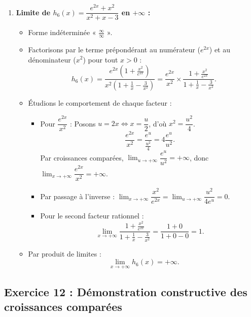 \documentclass[11pt,a4paper]{article}
\begin{document}
\begin{correctionbox}[Exercice 11]
\begin{enumerate}[label=\textbf{\arabic*.}]
    \item \textbf{Limite de $h_6(x) = \dfrac{e^{2x} + x^2}{x^2 + x - 3}$ en $+\infty$ :}
    \begin{itemize}
        \item Forme indéterminée « $\frac{\infty}{\infty}$ ».
        \item Factorisons par le terme prépondérant au numérateur ($e^{2x}$) et au dénominateur ($x^2$) pour tout $x > 0$ :
        \[
        h_6(x) = \frac{e^{2x}\left(1 + \frac{x^2}{e^{2x}}\right)}{x^2\left(1 + \frac{1}{x} - \frac{3}{x^2}\right)} = \frac{e^{2x}}{x^2} \times \frac{1 + \frac{x^2}{e^{2x}}}{1 + \frac{1}{x} - \frac{3}{x^2}}.
        \]
        \item Étudions le comportement de chaque facteur :
        \begin{itemize}
            \item Pour $\dfrac{e^{2x}}{x^2}$ : Posons $u = 2x \iff x = \dfrac{u}{2}$, d'où $x^2 = \dfrac{u^2}{4}$.
            \[
            \frac{e^{2x}}{x^2} = \frac{e^u}{\frac{u^2}{4}} = 4 \frac{e^u}{u^2}.
            \]
            Par croissances comparées, $\lim_{u \to +\infty} \dfrac{e^u}{u^2} = +\infty$, donc $\lim_{x \to +\infty} \dfrac{e^{2x}}{x^2} = +\infty$.
            \item Par passage à l'inverse : $\lim_{x \to +\infty} \dfrac{x^2}{e^{2x}} = \lim_{u \to +\infty} \dfrac{u^2}{4e^u} = 0$.
            \item Pour le second facteur rationnel :
            \[
            \lim_{x \to +\infty} \frac{1 + \frac{x^2}{e^{2x}}}{1 + \frac{1}{x} - \frac{3}{x^2}} = \frac{1 + 0}{1 + 0 - 0} = 1.
            \]
        \end{itemize}
        \item Par produit de limites :
        \[
        \boxed{\lim_{x \to +\infty} h_6(x) = +\infty}.
        \]
    \end{itemize}
\end{enumerate}
\end{correctionbox}

\subsection*{Exercice 12 : Démonstration constructive des croissances comparées}
\end{document}
